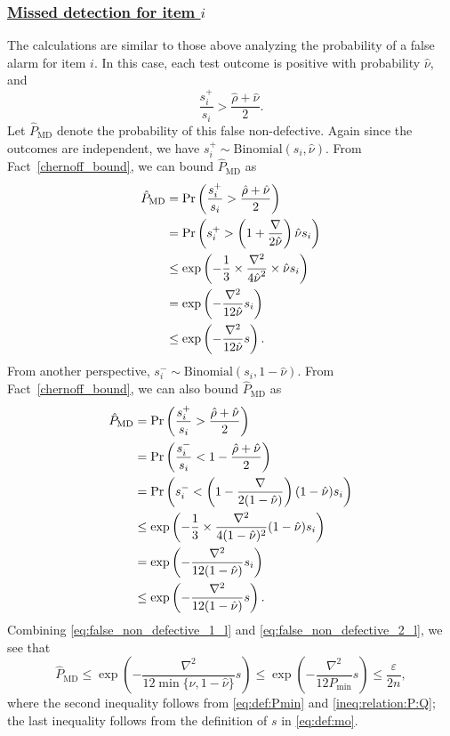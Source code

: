 \documentclass[onecolumn,letterpaper]{IEEEtran}
\newcommand{\mo}{{s}}
\newcommand{\moi}{{\mo_{i}}}
\newcommand{\moip}{{\mo_{i}^+}}
\newcommand{\moin}{{\mo_{i}^-}}
\newcommand{\spn}{{\rho}}
\newcommand{\spp}{{\nu}}
\newcommand{\spmin}{{P_{\min}}}
\newcommand{\fnl}{{\hat{P}_{\text{MD}}}}
\newcommand{\spnl}{{\hat{\spn}}}
\newcommand{\sppl}{{\hat{\spp}}}
\newcommand{\spgapl}{{\nabla}}
\begin{document}
\subsubsection{\underline{Missed detection for item $i$}} The calculations are similar to those above analyzing the probability of a false alarm for item $i$. In this case, each test outcome is positive with probability $\sppl$, and
\begin{equation}
    \frac{\moip}{\moi} > \frac{\spnl+\sppl}{2}.
\end{equation}
Let $\fnl$ denote the probability of this false non-defective. Again since the outcomes are independent, we have $\moip \sim \text{Binomial}(\moi,\sppl)$. From Fact~\ref{chernoff_bound}, we can bound $\fnl$ as
\begin{align}
\label{eq:false_non_defective_1_l}
\fnl &= \Pr \left( \frac{\moip}{\moi} > \frac{\spnl+\sppl}{2} \right) \notag\\
&= \Pr \left( \moip > \left( 1+\frac{\spgapl}{2\sppl} \right) \sppl \moi \right) \notag\\ 
&\le \exp\left( - \frac{1}{3} \times \frac{\spgapl^2}{4\sppl^2} \times \sppl \moi \right) \notag\\ 
&= \exp \left( -\frac{\spgapl^2}{12\sppl} \moi \right) \notag\\
&\le \exp \left( -\frac{\spgapl^2}{12\sppl} \mo \right).
\end{align}
From another perspective, $\moin \sim \text{Binomial} (\moi,1-\sppl)$. From Fact~\ref{chernoff_bound}, we can also bound $\fnl$ as
\begin{align}
\label{eq:false_non_defective_2_l}
\fnl &= \Pr \left( \frac{\moip}{\moi} > \frac{\spnl+\sppl}{2} \right) \notag\\
&= \Pr \left( \frac{\moin}{\moi} < 1 - \frac{\spnl+\sppl}{2} \right) \notag\\ 
&= \Pr \left( \moin < \left( 1 - \frac{\spgapl}{2(1-\sppl)} \right) (1 - \sppl) \moi \right) \notag\\ 
&\le \exp\left( - \frac{1}{3} \times \frac{\spgapl^2}{4(1-\sppl)^2} (1 - \sppl) \moi \right) \notag\\ 
&= \exp \left( - \frac{\spgapl^2}{12(1-\sppl)} \moi \right) \notag\\
&\le \exp \left( - \frac{\spgapl^2}{12(1-\sppl)} \mo \right).
\end{align}
Combining \eqref{eq:false_non_defective_1_l} and \eqref{eq:false_non_defective_2_l}, we see that
\begin{equation} \label{eq:false_non_defective_l}
\fnl \le \exp\left( -\frac{\spgapl^2}{12 \min\{\sppl,1-\sppl\}}\mo \right) \le \exp\left( - \frac{\spgapl^2}{12\spmin} \mo \right) \le \frac{\varepsilon}{2n},
\end{equation}
where the second inequality follows from \eqref{eq:def:Pmin} and \eqref{ineq:relation:P:Q}; the last inequality follows from the definition of $\mo$ in \eqref{eq:def:mo}.
\end{document}
